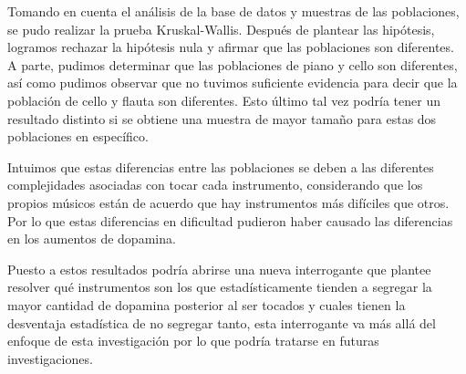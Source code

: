 Tomando en cuenta el análisis de la base de datos y muestras de las poblaciones, se pudo realizar la prueba Kruskal-Wallis. Después de plantear las hipótesis, logramos rechazar la hipótesis nula y afirmar que las poblaciones son diferentes. A parte, pudimos determinar que las poblaciones de piano y cello son diferentes, así como pudimos observar que no tuvimos suficiente evidencia para decir que la población de cello y flauta son diferentes. Esto último tal vez podría tener un resultado distinto si se obtiene una muestra de mayor tamaño para estas dos poblaciones en específico.


Intuimos que estas diferencias entre las poblaciones se deben a las diferentes complejidades asociadas con tocar cada instrumento, considerando que los propios músicos están de acuerdo que hay instrumentos más difíciles que otros. Por lo que estas diferencias en dificultad pudieron haber causado las diferencias en los aumentos de dopamina. 



Puesto a estos resultados podría abrirse una nueva interrogante que plantee resolver qué instrumentos son los que estadísticamente tienden a segregar la mayor cantidad de dopamina posterior al ser tocados y cuales tienen la desventaja estadística de no segregar tanto, esta interrogante va más allá del enfoque de esta investigación por lo que podría tratarse en futuras investigaciones.
